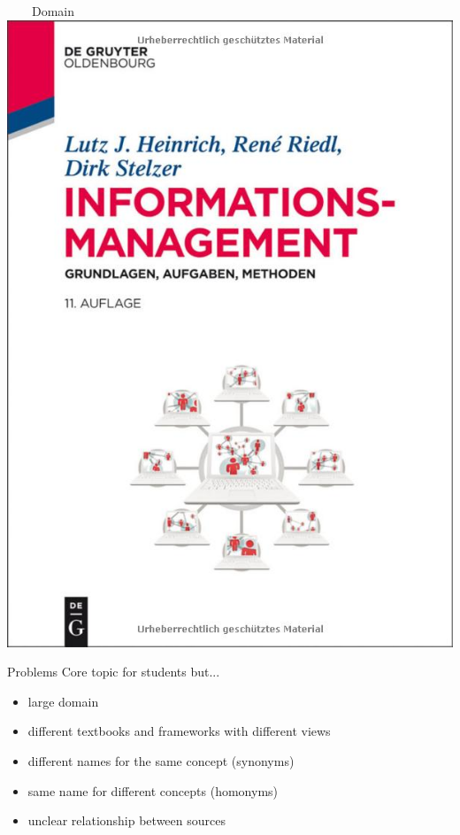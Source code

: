 \documentclass[aspectratio=1610,12pt]{beamer}
\begin{document}
\begin{frame}[plain]{~~~~Domain}
\centering\includegraphics[height=0.77\textheight,keepaspectratio]{img/book-he.jpg}
\end{frame}
\restoregeometry

\begin{frame}{Problems}
Core topic for students but...
\begin{itemize}
\item large domain
\item different textbooks and frameworks with different views
\item different names for the same concept (synonyms)
\item same name for different concepts  (homonyms)
\item unclear relationship between sources
\end{itemize}
\end{frame}
\end{document}
